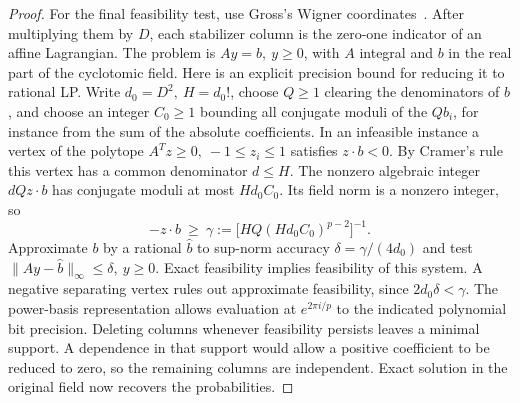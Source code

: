 \documentclass[11pt,letterpaper]{article}
\theoremstyle{definition}
\numberwithin{equation}{section}
\begin{document}
\begin{proof}
For the final feasibility test, use Gross's Wigner coordinates~\cite{gross}. After multiplying them by \(D\), each stabilizer column is the zero-one indicator of an affine Lagrangian. The problem is \(Ay=b,\ y\ge0\), with \(A\) integral and \(b\) in the real part of the cyclotomic field. Here is an explicit precision bound for reducing it to rational LP. Write \(d_0=D^2,\ H=d_0!\), choose \(Q\ge1\) clearing the denominators of \(b\), and choose an integer \(C_0\ge1\) bounding all conjugate moduli of the \(Qb_i\), for instance from the sum of the absolute coefficients. In an infeasible instance a vertex of the polytope \(A^Tz\ge0,\ -1\le z_i\le1\) satisfies \(z\cdot b<0\). By Cramer's rule this vertex has a common denominator \(d\le H\). The nonzero algebraic integer \(dQz\cdot b\) has conjugate moduli at most \(Hd_0 C_0\). Its field norm is a nonzero integer, so
\[
 -z\cdot b\ \ge\ \gamma
 :=\bigl[H Q(Hd_0 C_0)^{p-2}\bigr]^{-1}.
\]
Approximate \(b\) by a rational \(\widehat b\) to sup-norm accuracy \(\delta=\gamma/(4d_0)\) and test \(\|Ay-\widehat b\|_\infty\le\delta,\ y\ge0\). Exact feasibility implies feasibility of this system. A negative separating vertex rules out approximate feasibility, since \(2d_0\delta<\gamma\). The power-basis representation allows evaluation at \(e^{2\pi i/p}\) to the indicated polynomial bit precision. Deleting columns whenever feasibility persists leaves a minimal support. A dependence in that support would allow a positive coefficient to be reduced to zero, so the remaining columns are independent. Exact solution in the original field now recovers the probabilities.
\end{proof}
\end{document}
